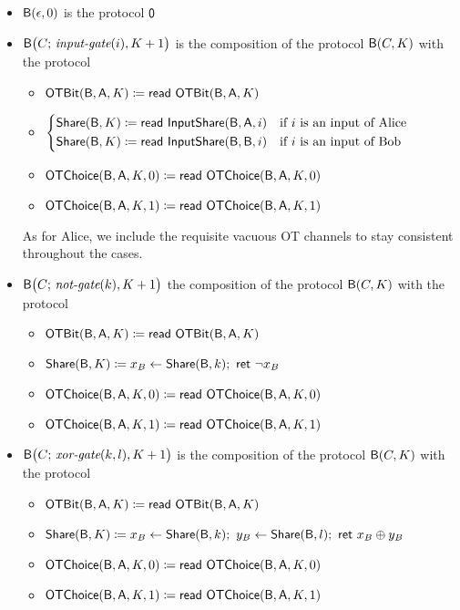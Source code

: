 \begin{itemize}
\item $\mathsf{B}(\epsilon,0)$ is the protocol $\mathsf{0}$
\item $\mathsf{B}\big(C; \, \textit{input-gate}(i),K+1\big)$ is the composition of the protocol $\mathsf{B}(C,K)$ with the protocol
\begin{itemize}
\item $\mathsf{OTBit}(\mathsf{B},\mathsf{A},K) \coloneqq \mathsf{read} \ \mathsf{OTBit}(\mathsf{B},\mathsf{A},K)$\smallskip
\item $\begin{cases*} \Share(\B,K) \coloneqq \read{\InputShare(\B,\A,i)} & \text{if $i$ is an input of Alice} \\ \Share(\B,K)\coloneqq \read{\InputShare(\B,\B,i)} & \text{if $i$ is an input of Bob} \end{cases*}$\smallskip
\item $\mathsf{OTChoice}(\mathsf{B},\mathsf{A},K,0) \coloneqq \mathsf{read} \ \mathsf{OTChoice}(\mathsf{B},\mathsf{A},K,0)$
\item $\mathsf{OTChoice}(\mathsf{B},\mathsf{A},K,1) \coloneqq \mathsf{read} \ \mathsf{OTChoice}(\mathsf{B},\mathsf{A},K,1)$
\end{itemize}
As for Alice, we include the requisite vacuous OT channels to stay consistent throughout the cases.
\item $\mathsf{B}\big(C; \, \textit{not-gate}(k),K+1\big)$ the composition of the protocol $\mathsf{B}(C,K)$ with the protocol
\begin{itemize}
\item $\mathsf{OTBit}(\mathsf{B},\mathsf{A},K) \coloneqq \mathsf{read} \ \mathsf{OTBit}(\mathsf{B},\mathsf{A},K)$\smallskip
\item $\mathsf{Share}(\mathsf{B},K) \coloneqq x_B \leftarrow \mathsf{Share}(\mathsf{B},k); \ \mathsf{ret} \ \neg x_B$\smallskip
\item $\mathsf{OTChoice}(\mathsf{B},\mathsf{A},K,0) \coloneqq \mathsf{read} \ \mathsf{OTChoice}(\mathsf{B},\mathsf{A},K,0)$
\item $\mathsf{OTChoice}(\mathsf{B},\mathsf{A},K,1) \coloneqq \mathsf{read} \ \mathsf{OTChoice}(\mathsf{B},\mathsf{A},K,1)$
\end{itemize}
\item $\mathsf{B}\big(C; \, \textit{xor-gate}(k,l),K+1\big)$ is the composition of the protocol $\mathsf{B}(C,K)$ with the protocol
\begin{itemize}
\item $\mathsf{OTBit}(\mathsf{B},\mathsf{A},K) \coloneqq \mathsf{read} \ \mathsf{OTBit}(\mathsf{B},\mathsf{A},K)$\smallskip
\item $\mathsf{Share}(\mathsf{B},K) \coloneqq x_B \leftarrow \mathsf{Share}(\mathsf{B},k); \ y_B \leftarrow \mathsf{Share}(\mathsf{B},l); \ \mathsf{ret} \ x_B \oplus y_B$\smallskip
\item $\mathsf{OTChoice}(\mathsf{B},\mathsf{A},K,0) \coloneqq \mathsf{read} \ \mathsf{OTChoice}(\mathsf{B},\mathsf{A},K,0)$
\item $\mathsf{OTChoice}(\mathsf{B},\mathsf{A},K,1) \coloneqq \mathsf{read} \ \mathsf{OTChoice}(\mathsf{B},\mathsf{A},K,1)$
\end{itemize}

\end{itemize}
